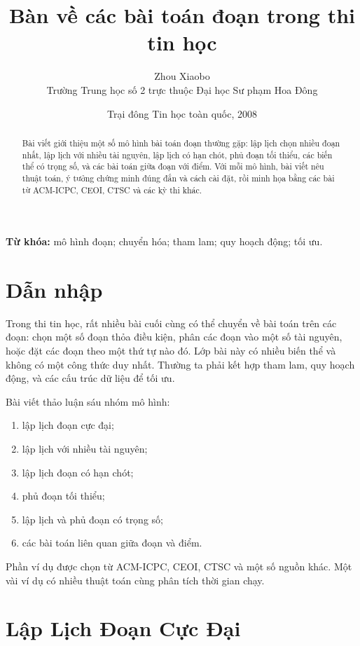 \documentclass[11pt]{article}
\title{Bàn về các bài toán đoạn trong thi tin học}
\author{Zhou Xiaobo\\Trường Trung học số 2 trực thuộc Đại học Sư phạm Hoa Đông}
\date{Trại đông Tin học toàn quốc, 2008}
\begin{document}
\maketitle


\renewcommand{\abstractname}{Tóm tắt}
\begin{abstract}
Bài viết giới thiệu một số mô hình bài toán đoạn thường gặp: lập lịch chọn
nhiều đoạn nhất, lập lịch với nhiều tài nguyên, lập lịch có hạn chót, phủ
đoạn tối thiểu, các biến thể có trọng số, và các bài toán giữa đoạn với điểm.
Với mỗi mô hình, bài viết nêu thuật toán, ý tưởng chứng minh đúng đắn và cách
cài đặt, rồi minh họa bằng các bài từ ACM-ICPC, CEOI, CTSC và các kỳ thi khác.
\end{abstract}

\noindent\textbf{Từ khóa:} mô hình đoạn; chuyển hóa; tham lam; quy hoạch động;
tối ưu.

\section*{Dẫn nhập}

Trong thi tin học, rất nhiều bài cuối cùng có thể chuyển về bài toán trên các
đoạn: chọn một số đoạn thỏa điều kiện, phân các đoạn vào một số tài nguyên,
hoặc đặt các đoạn theo một thứ tự nào đó. Lớp bài này có nhiều biến thể và
không có một công thức duy nhất. Thường ta phải kết hợp tham lam, quy hoạch
động, và các cấu trúc dữ liệu để tối ưu.

Bài viết thảo luận sáu nhóm mô hình:
\begin{enumerate}
  \item lập lịch đoạn cực đại;
  \item lập lịch với nhiều tài nguyên;
  \item lập lịch đoạn có hạn chót;
  \item phủ đoạn tối thiểu;
  \item lập lịch và phủ đoạn có trọng số;
  \item các bài toán liên quan giữa đoạn và điểm.
\end{enumerate}
Phần ví dụ được chọn từ ACM-ICPC, CEOI, CTSC và một số nguồn khác. Một vài ví
dụ có nhiều thuật toán cùng phân tích thời gian chạy.

\section{Lập Lịch Đoạn Cực Đại}
\end{document}
